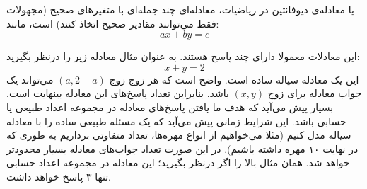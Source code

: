 
\begin{definition}
    \p
    یا معادله‌ی دیوفانتین در ریاضیات،
    معادله‌ای چند جمله‌ای با متغیرهای صحیح
    (مجهولات فقط می‌توانند مقادیر صحیح اتخاذ کنند)
    است، مانند: 
    $$ax+by=c$$
\end{definition}

\p
این معادلات معمولا دارای چند پاسخ هستند.
به عنوان مثال معادله زیر را درنظر بگیرید:
$$x + y = 2$$
این یک معادله سیاله ساده است.
واضح است که هر زوج زوج
$(a, 2-a)$
می‌تواند یک جواب معادله برای زوج
$(x,y)$
باشد. بنابراین تعداد پاسخ‌های این معادله بینهایت است.
بسیار پیش می‌آید که هدف ما یافتن پاسخ‌های معادله در مجموعه اعداد طبیعی یا حسابی باشد.
این شرایط زمانی پیش می‌آید که یک مسئله طبیعی ساده را با معادله سیاله مدل کنیم
(مثلا می‌خواهیم از انواع مهره‌ها، تعداد متفاوتی برداریم به طوری که در نهایت ۱۰ مهره داشته باشیم).
در این صورت تعداد جواب‌های معادله بسیار محدود‌تر خواهد شد.
همان مثال بالا را اگر درنظر بگیرید؛ این معادله در مجموعه اعداد حسابی تنها ۳ پاسخ خواهد داشت.




